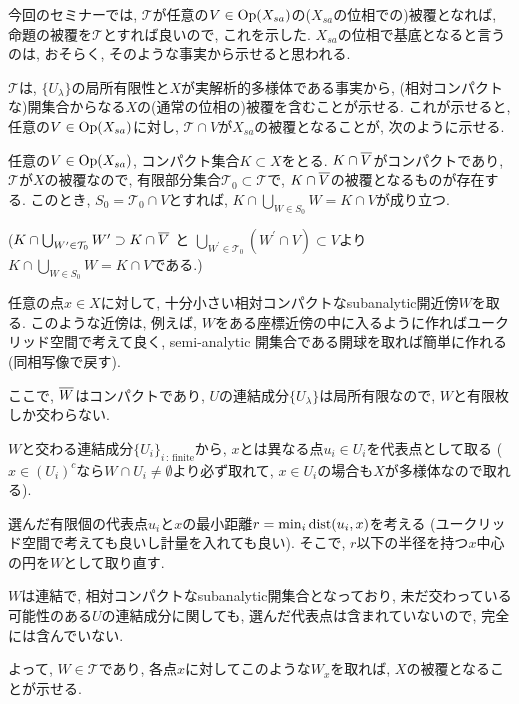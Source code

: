 \documentclass[../main]{subfiles}
\begin{document}
今回のセミナーでは,
$\mathcal{T}$が任意の$V\in\mathrm{Op}(X_{sa})$の($X_{sa}$の位相での)被覆となれば,
命題の被覆を$\mathcal{T}$とすれば良いので, これを示した.
$X_{sa}$の位相で基底となると言うのは, おそらく, そのような事実から示せると思われる.
\begin{rem*}
  $\mathcal{T}$は,
  $\{U_\lambda\}$の局所有限性と$X$が実解析的多様体である事実から,
  (相対コンパクトな)開集合からなる$X$の(通常の位相の)被覆を含むことが示せる.
  これが示せると,
  任意の$V\in\mathrm{Op}(X_{sa})$に対し,
  $\mathcal{T}\cap V$が$X_{sa}$の被覆となることが,
  次のように示せる.

  任意の$V\in\mathrm{Op}(X_{sa})$, コンパクト集合$K\subset X$をとる.
  $K\cap {\overline{V}}$がコンパクトであり,
  $\mathcal{T}$が$X$の被覆なので,
  有限部分集合$\mathcal{T}_0\subset\mathcal{T}$で,
  $K\cap {\overline{V}}$の被覆となるものが存在する.
  このとき, $S_0 = \mathcal{T}_0\cap V$とすれば,
  $K\cap\bigcup_{W\in S_0}W = K\cap V$が成り立つ.

  ($K\cap\bigcup_{W^\prime \in \mathcal{T}_0}W^\prime \supset K\cap {\overline{V}}$ と
  $\bigcup_{W^\prime \in \mathcal{T}_0}(W^\prime\cap V) \subset V$より
  $K\cap\bigcup_{W\in S_0}W = K\cap V$である.)
\end{rem*}
\begin{rem*}
  任意の点$x\in X$に対して,
  十分小さい相対コンパクトなsubanalytic開近傍$W$を取る.
  このような近傍は, 例えば,
  $W$をある座標近傍の中に入るように作ればユークリッド空間で考えて良く,
  semi-analytic 開集合である開球を取れば簡単に作れる(同相写像で戻す).

  ここで, ${\overline{W}}$はコンパクトであり,
  $U$の連結成分$\{U_\lambda\}$は局所有限なので,
  $W$と有限枚しか交わらない.

  $W$と交わる連結成分$\{U_i\}_{i\,:\,\mathrm{finite}}$から,
  $x$とは異なる点$u_i\in U_i$を代表点として取る
  ($x\in (U_i)^c$なら$W\cap U_i\neq\emptyset$より必ず取れて,
  $x\in U_i$の場合も$X$が多様体なので取れる).

  選んだ有限個の代表点$u_i$と$x$の最小距離$r = \min_i \mathrm{dist}(u_i,x)$を考える
  (ユークリッド空間で考えても良いし計量を入れても良い).
  そこで, $r$以下の半径を持つ$x$中心の円を$W$として取り直す.

  $W$は連結で, 相対コンパクトなsubanalytic開集合となっており,
  未だ交わっている可能性のある$U$の連結成分に関しても,
  選んだ代表点は含まれていないので,
  完全には含んでいない.

  よって, $W\in\mathcal{T}$であり,
  各点$x$に対してこのような$W_x$を取れば,
  $X$の被覆となることが示せる.
\end{rem*}
\end{document}
